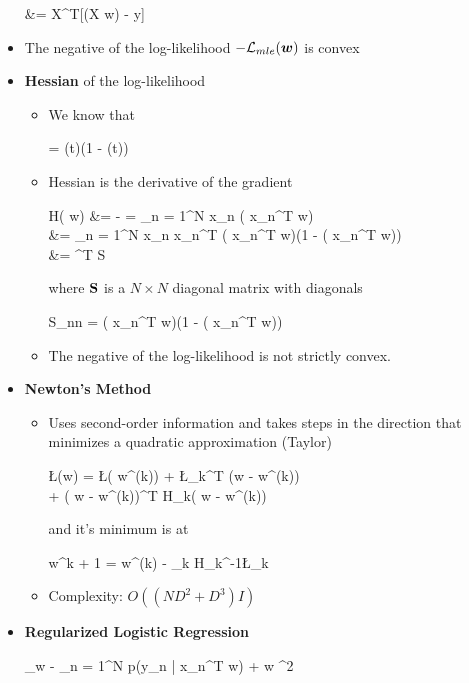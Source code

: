 \begin{itemize}
\begin{myalign*}
	    &= \*X^T[\sigma(\*X \bm w) - \*y]
	\end{myalign*}
	\item The negative of the log-likelihood $- \mathcal{L}_{mle}(\bm w)$ is convex
	\item \textbf{Hessian} of the log-likelihood
	\begin{itemize}
		\item We know that
		\begin{myalign*}
		     = \sigma(t)(1 - \sigma(t))
		\end{myalign*}
		\item Hessian is the derivative of the gradient
		\begin{myalign*}
		    \*H(\* w) &= -   = \sum_{n = 1}^N  \* x_n \sigma(\* x_n^T \* w) \\
		    &= \sum_{n = 1}^N \* x_n \* x_n^T \sigma(\* x_n^T \* w)(1 - \sigma(\* x_n^T \* w)) \\
		    &= ^T \*S \tilde{\*X}
		\end{myalign*}
		where $\mathbf{S}$ is a $N \times N$ diagonal matrix with diagonals
		\begin{myalign*}
		    S_{nn} = \sigma(\* x_n^T\* w)(1 - \sigma(\* x_n^T \* w))
		\end{myalign*}
		\item The negative of the log-likelihood is not strictly convex.
	\end{itemize}
	\item \textbf{Newton's Method} %
	\begin{itemize}
		\item Uses second-order information and takes steps in the direction that minimizes a quadratic approximation (Taylor)
		\begin{myalign*}
		    \L(\*w) = \L(\* w^{(k)}) + \*\nabla\L_k^T (\*w - \* w^{(k)})\\ + (\* w - \* w^{(k)})^T \*H_k(\* w - \* w^{(k)})
		\end{myalign*}
		and it's minimum is at
		\begin{myalign*}
		    \* w^{k + 1} =\* w^{(k)} - \gamma_k \*H_k^{-1}\*\nabla\L_k
		\end{myalign*}
		\item Complexity: $O((ND^2 + D^3)I)$
	\end{itemize}
	\item \textbf{Regularized Logistic Regression}
	\begin{myalign*}
	    \argmin_{\*w} 
	    	- \sum_{n = 1}^N \ln p(\*y_n | \*x_n^T \* w) +  \lVert \*w \lVert^2
	    \end{myalign*}
\end{itemize}

